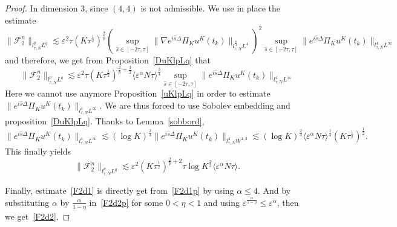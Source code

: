 \documentclass[10pt,a4paper]{article}
\begin{document}
\begin{proof}
    In dimension \(3\), since \((4,4)\) is not admissible. We use in place the
    estimate 
    \begin{equation}
      \| \mathcal F_2^n \|_{l^p_{\tau, N}L^q} \lesssim \varepsilon^2 \tau 
      (K\tau^\frac12)^\frac2p \left(\sup_{\hat s \in [-2\tau, \tau]} 
      \|\nabla e^{i\hat s\Delta}\Pi_{K}u^K(t_k)\|_{l^\frac83_{\tau,N}L^4} \right)^2 
      \sup_{\hat s \in [-2\tau, \tau]} \|e^{i\hat s\Delta }\Pi_K u^K(t_k)\|_{l^4_{\tau, N}L^\infty}
    \end{equation}
    and therefore, we get from Proposition~\ref{DuKlpLq} that 
    \[ \| \mathcal F_2^n \|_{l^p_{\tau, N}L^q} \lesssim \varepsilon^2 \tau 
    (K\tau^\frac12)^{\frac2p+\frac32} {\langle\varepsilon^\alpha N\tau\rangle}^\frac34 
    \sup_{\hat s \in [-2\tau, \tau]} \|e^{i\hat s\Delta }\Pi_K u^K(t_k)\|_{l^4_{\tau, N}L^\infty} \]
    Here we cannot use anymore Proposition~\ref{uKlpLq} in order to estimate 
    \(\|e^{i \hat s\Delta }\Pi_{K} u^K(t_{k})\|_{l^4_{\tau, N}L^\infty}\). We 
    are thus forced to use Sobolev embedding and proposition~\ref{DuKlpLq}. 
    Thanks to Lemma~\ref{sobbord}, 
    \[ \|e^{i\hat s\Delta }\Pi_K u^K(t_k)\|_{l^4_{\tau, N}L^\infty} \lesssim 
    (\log K)^\frac23 \|e^{i\hat s\Delta }\Pi_K u^K(t_k)\|_{l^4_{\tau, N}W^{1,3}}
    \lesssim (\log K)^\frac23 {\langle\varepsilon^\alpha N\tau\rangle}^\frac14 
    (K\tau^\frac12)^\frac12 .\]
    This finally yields 
    \[ \| \mathcal F_2^n \|_{l^p_{\tau,N}L^q} \lesssim \varepsilon^2 (K\tau^\frac12)^{\frac2p+2}
    \tau \log{K}^\frac23 \langle\varepsilon^\alpha N\tau\rangle.\]

    Finally, estimate~\eqref{F2d1} is directly get from~\eqref{F2d1p} by using
    \(\alpha\leq4\). And by substituting \(\alpha\) by \(\frac\alpha{1-\eta}\) 
    in~\eqref{F2d2p} for some \(0<\eta<1\) and using 
    \(\varepsilon^\frac\alpha{1-\eta}\leq\varepsilon^\alpha\), then we
    get~\eqref{F2d2}.
  \end{proof}
\end{document}
